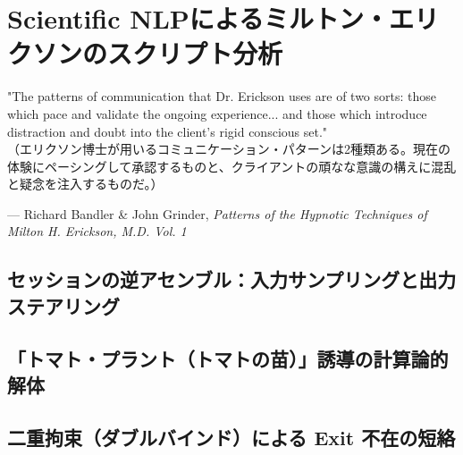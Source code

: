 \chapter{Scientific NLPによるミルトン・エリクソンのスクリプト分析}
\epigraph{"The patterns of communication that Dr. Erickson uses are of two sorts: those which pace and validate the ongoing experience... and those which introduce distraction and doubt into the client's rigid conscious set."\\
\small（エリクソン博士が用いるコミュニケーション・パターンは2種類ある。現在の体験にペーシングして承認するものと、クライアントの頑なな意識の構えに混乱と疑念を注入するものだ。）}{--- Richard Bandler \& John Grinder, \textit{Patterns of the Hypnotic Techniques of Milton H. Erickson, M.D. Vol. 1}}

\section{セッションの逆アセンブル：入力サンプリングと出力ステアリング}

\section{「トマト・プラント（トマトの苗）」誘導の計算論的解体}

\section{二重拘束（ダブルバインド）による Exit 不在の短絡}
